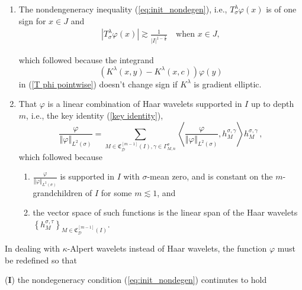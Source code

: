 \documentclass{amsart}%
\theoremstyle{plain}
\numberwithin{equation}{section}
\begin{document}
\begin{enumerate}


\item The nondengeneracy inequality
(\ref{eq:init_nondegen}), i.e.,  $T_{\sigma}^{\lambda}\varphi\left(  x\right)$ is of one sign for $x \in J$ and 
\begin{align}\label{eq:nondegen_original}
\left\vert T_{\sigma}^{\lambda}\varphi\left(  x\right)  \right\vert
\gtrsim\frac{1}{\left|  I\right|  ^{1-\frac{\lambda}{n}} } \quad\text{
when } x \in J,
\end{align}

which followed because the integrand%
\begin{equation}
\left(  K^{\lambda}\left(  x,y\right)  -K^{\lambda}\left(  x,c\right)
\right)  \varphi\left(  y\right)  \label{T phi'}%
\end{equation}
in (\ref{T phi pointwise}) doesn't change sign if $K^{\lambda}$ is gradient elliptic.

\item That $\varphi$ is a linear combination of Haar wavelets supported in $I$ up to depth $m$, i.e., the key identity (\ref{key identity}),
\begin{equation}
\frac{\varphi}{\left\Vert \varphi\right\Vert _{L^{2}\left(  \sigma\right)  }%
}=\sum_{M\in\mathfrak{C}_{\mathcal{D}}^{\left[  m-1\right]  }\left(  I\right)
,\gamma\in\Gamma_{M,n}^{\sigma}}\left\langle \frac{\varphi}{\left\Vert
\varphi\right\Vert _{L^{2}\left(  \sigma\right)  }},h_{M}^{\sigma,\gamma
}\right\rangle h_{M}^{\sigma,\gamma} \, ,
\end{equation}
	which followed because
\begin{enumerate}
\item $\frac{\varphi}{\left\Vert \varphi\right\Vert _{L^{2}\left(
\sigma\right)  }}$ is supported in $I$ with $\sigma$-mean zero, and is
constant on the $m$-grandchildren of $I$ for some $m \lesssim1$, and

\item the vector space of such functions is the linear span of the Haar
wavelets $\left\{  h_{M}^{\sigma,\tau}\right\}  _{M\in\mathfrak{C}%
_{\mathcal{D}}^{\left[  m-1\right]  }\left(  I\right)  }$.
\end{enumerate}
\end{enumerate}

In dealing with $\kappa$-Alpert wavelets instead of Haar wavelets, the
function $\varphi$ must be redefined so that

(\textbf{I}) the nondegeneracy condition (\ref{eq:init_nondegen}) continutes to hold
\end{document}
